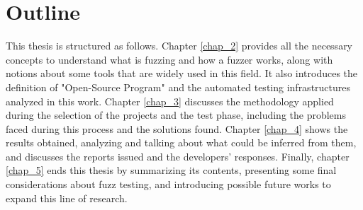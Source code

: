 \section{Outline}
This thesis is structured as follows. Chapter \ref{chap_2} provides all the necessary concepts to understand what is fuzzing and how a fuzzer works, along with notions about some tools that are widely used in this field. It also introduces the definition of "Open-Source Program" and the automated testing infrastructures analyzed in this work. Chapter \ref{chap_3} discusses the methodology applied during the selection of the projects and the test phase, including the problems faced during this process and the solutions found. Chapter \ref{chap_4} shows the results obtained, analyzing and talking about what could be inferred from them, and discusses the reports issued and the developers' responses. Finally, chapter \ref{chap_5} ends this thesis by summarizing its contents, presenting some final considerations about fuzz testing, and introducing possible future works to expand this line of research.